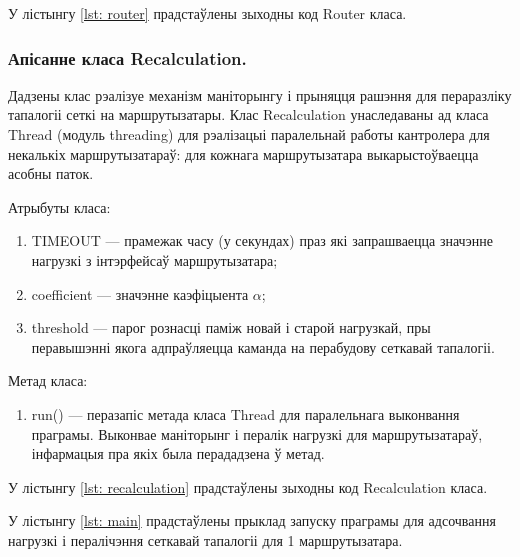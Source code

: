 У лістынгу \ref{lst: router} прадстаўлены зыходны код Router класа.



\vspace{-\baselineskip}

\subsubsection{Апісанне класа Recalculation.}

Дадзены клас рэалізуе механізм маніторынгу і прыняцця рашэння для пераразліку тапалогіі сеткі на маршрутызатары.
Клас Recalculation унаследаваны ад класа Thread (модуль threading) для рэалізацыі паралельнай работы кантролера для
некалькіх маршрутызатараў: для кожнага маршрутызатара выкарыстоўваецца асобны паток.

Атрыбуты класа:
\begin{enumerate}
    \item TIMEOUT --- прамежак часу (у секундах) праз які запрашваецца значэнне нагрузкі з інтэрфейсаў маршрутызатара;
    \item coefficient --- значэнне каэфіцыента $\alpha$;
    \item threshold --- парог рознасці паміж новай і старой нагрузкай, пры
    перавышэнні якога адпраўляецца каманда на перабудову сеткавай тапалогіі.
\end{enumerate}

Метад класа:
\begin{enumerate}
    \item run() --- перазапіс метада класа Thread для паралельнага выконвання праграмы. Выконвае маніторынг і пералік нагрузкі для маршрутызатараў, інфармацыя пра якіх была перададзена ў метад.
\end{enumerate}

У лістынгу \ref{lst: recalculation} прадстаўлены зыходны код Recalculation класа.



У лістынгу  \ref{lst: main} прадстаўлены прыклад запуску праграмы для адсочвання
нагрузкі і пералічэння сеткавай тапалогіі для 1 маршрутызатара.



